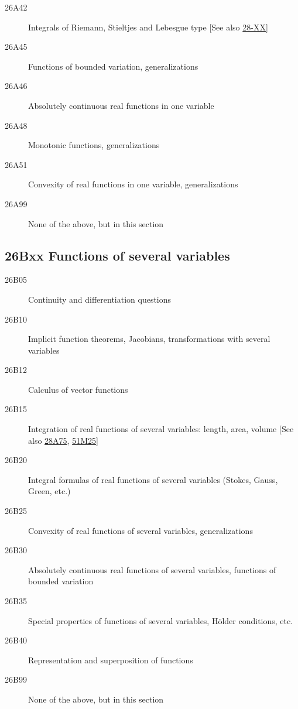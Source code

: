 \documentclass[letterpaper]{article}
\begin{document}
\begin{description}
\item [26A42]\label{26A42} Integrals of Riemann, Stieltjes and Lebesgue type [See also \hyperref[28-XX]{28-XX}]
\item [26A45]\label{26A45} Functions of bounded variation, generalizations
\item [26A46]\label{26A46} Absolutely continuous real functions in one variable
\item [26A48]\label{26A48} Monotonic functions, generalizations
\item [26A51]\label{26A51} Convexity of real functions in one variable, generalizations
\item [26A99]\label{26A99} None of the above, but in this section
\end{description}
\subsection*{26Bxx  Functions of several variables }\label{26Bxx}
\begin{description} 
\item [26B05]\label{26B05} Continuity and differentiation questions
\item [26B10]\label{26B10} Implicit function theorems, Jacobians, transformations with several variables
\item [26B12]\label{26B12} Calculus of vector functions
\item [26B15]\label{26B15} Integration of real functions of several variables: length, area, volume [See also \hyperref[28A75]{28A75}, \hyperref[51M25]{51M25}]
\item [26B20]\label{26B20} Integral formulas of real functions of several variables (Stokes, Gauss, Green, etc.)
\item [26B25]\label{26B25} Convexity of real functions of several variables, generalizations
\item [26B30]\label{26B30} Absolutely continuous real functions of several variables, functions of bounded variation
\item [26B35]\label{26B35} Special properties of functions of several variables, H\"{o}lder conditions, etc.
\item [26B40]\label{26B40} Representation and superposition of functions
\item [26B99]\label{26B99} None of the above, but in this section
\end{description}
\end{document}
